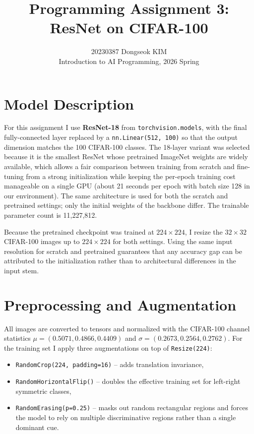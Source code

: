 \documentclass[10pt,a4paper]{article}
\title{Programming Assignment 3: ResNet on CIFAR-100}
\author{20230387 Dongseok KIM \\ Introduction to AI Programming, 2026 Spring}
\date{}
\begin{document}
\maketitle

\section{Model Description}

For this assignment I use \textbf{ResNet-18} from \texttt{torchvision.models}, with the final fully-connected layer replaced by a \texttt{nn.Linear(512, 100)} so that the output dimension matches the 100 CIFAR-100 classes. The 18-layer variant was selected because it is the smallest ResNet whose pretrained ImageNet weights are widely available, which allows a fair comparison between training from scratch and fine-tuning from a strong initialization while keeping the per-epoch training cost manageable on a single GPU (about 21 seconds per epoch with batch size 128 in our environment). The same architecture is used for both the scratch and pretrained settings; only the initial weights of the backbone differ. The trainable parameter count is 11{,}227{,}812.

Because the pretrained checkpoint was trained at $224 \times 224$, I resize the $32 \times 32$ CIFAR-100 images up to $224 \times 224$ for both settings. Using the same input resolution for scratch and pretrained guarantees that any accuracy gap can be attributed to the initialization rather than to architectural differences in the input stem.

\section{Preprocessing and Augmentation}

All images are converted to tensors and normalized with the CIFAR-100 channel statistics $\mu = (0.5071, 0.4866, 0.4409)$ and $\sigma = (0.2673, 0.2564, 0.2762)$. For the training set I apply three augmentations on top of \texttt{Resize(224)}:

\begin{itemize}[leftmargin=*,itemsep=0pt]
    \item \texttt{RandomCrop(224, padding=16)} -- adds translation invariance,
    \item \texttt{RandomHorizontalFlip()} -- doubles the effective training set for left-right symmetric classes,
    \item \texttt{RandomErasing(p=0.25)} -- masks out random rectangular regions and forces the model to rely on multiple discriminative regions rather than a single dominant cue.
\end{itemize}
\end{document}
